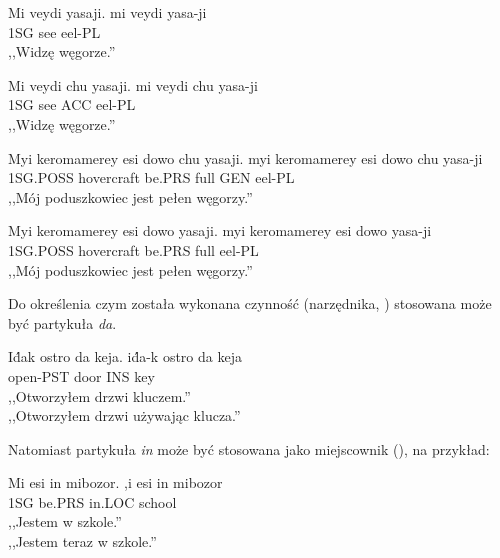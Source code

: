 \begin{spacing}{1.1}
\begin{exe}
	\ex
	\trans Mi veydi yasaji.
	\gll  mi veydi yasa-ji \\
	  1SG see eel-PL \\
	\glt  ,,Widzę węgorze.''
\end{exe}

\begin{exe}
	\ex
	\trans Mi veydi chu yasaji.
	\gll  mi veydi chu yasa-ji \\
	  1SG see ACC eel-PL \\
	\glt  ,,Widzę węgorze.''
\end{exe}

\begin{exe}
	\ex
	\trans Myi keromamerey esi dowo chu yasaji.
	\gll  myi keromamerey esi dowo chu yasa-ji \\
	  1SG.POSS hovercraft be.PRS full GEN eel-PL \\
	\glt  ,,Mój poduszkowiec jest pełen węgorzy.''
\end{exe}

\begin{exe}
	\ex
	\trans Myi keromamerey esi dowo yasaji.
	\gll  myi keromamerey esi dowo yasa-ji \\
	  1SG.POSS hovercraft be.PRS full eel-PL \\
	\glt  ,,Mój poduszkowiec jest pełen węgorzy.''
\end{exe}

Do określenia czym została wykonana czynność (narzędnika, \Ins{})
stosowana może być partykuła \emph{da}.

\begin{exe}
	\ex
	\trans Id́ak ostro da keja.
	\gll  id́a-k ostro da keja \\
	  open-PST door INS key \\
	\glt  ,,Otworzyłem drzwi kluczem.'' \\ ,,Otworzyłem drzwi używając klucza.''
\end{exe}

Natomiast partykuła \emph{in} może być stosowana jako miejscownik
(\Loc{}), na przykład:

\begin{exe}
	\ex
	\trans Mi esi in mibozor.
	\gll  ,i esi in mibozor \\
	  1SG be.PRS in.LOC school \\
	\glt  ,,Jestem w szkole.'' \\ ,,Jestem teraz w szkole.''
\end{exe}


\end{spacing}
